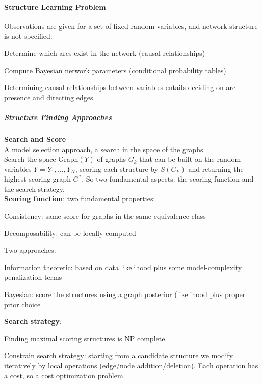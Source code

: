 \documentclass[10pt]{report}
\begin{document}
\paragraph{Structure Learning Problem} Observations are given for a set of fixed random variables, and network structure is not specified:\begin{list}{}{}
	\item Determine which arcs exist in the network (causal relationships)
	\item Compute Bayesian network parameters (conditional probability tables)
\end{list}
Determining causal relationships between variables entails deciding on arc presence and directing edges.
\subparagraph{Structure Finding Approaches}\begin{list}{}{}
	\item \textbf{Search and Score}\\A model selection approach, a search in the space of the graphs.\\
	Search the space Graph$(Y)$ of graphs $G_k$ that can be built on the random variables $Y = Y_1,\ldots,Y_N$, scoring each structure by $S(G_k)$ and returning the highest scoring graph $G^*$. So two fundamental aspects: the scoring function and the search strategy.\\
	\textbf{Scoring function}: two fundamental properties:\begin{list}{}{}
		\item Consistency: same score for graphs in the same equivalence class
		\item Decomposability: can be locally computed
	\end{list}
	Two approaches:\begin{list}{}{}
		\item Information theoretic: based on data likelihood plus some model-complexity penalization terms
		\item Bayesian: score the structures using a graph posterior (likelihood plus proper prior choice
	\end{list}
	\textbf{Search strategy}:\begin{list}{}{}
		\item Finding maximal scoring structures is NP complete
		\item Constrain search strategy: starting from a candidate structure we modify iteratively by local operations (edge/node addition/deletion). Each operation has a cost, so a cost optimization problem.
	\end{list}

\end{list}
\end{document}
